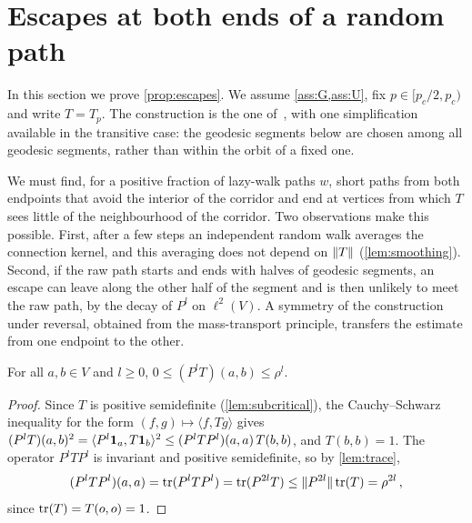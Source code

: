 \section{Escapes at both ends of a random path}\label{sec:escapes}

In this section we prove \cref{prop:escapes}. We assume \cref{ass:G,ass:U}, fix $p\in[p_c/2,p_c)$ and
write $T=T_p$. The construction is the one of~\cite{Ope26}, with one simplification available in the
transitive case: the geodesic segments below are chosen among all geodesic segments, rather than within
the orbit of a fixed one.

We must find, for a positive fraction of lazy-walk paths $w$, short paths from both endpoints that avoid
the interior of the corridor and end at vertices from which $T$ sees little of the neighbourhood of the
corridor. Two observations make this possible. First, after a few steps an independent random walk
averages the connection kernel, and this averaging does not depend on $\lVert T\rVert$
(\cref{lem:smoothing}). Second, if the raw path starts and ends with halves of geodesic segments, an
escape can leave along the other half of the segment and is then unlikely to meet the raw path, by the
decay of $P^l$ on $\ell^2(V)$. A symmetry of the construction under reversal, obtained from the
mass-transport principle, transfers the estimate from one endpoint to the other.

\begin{lemma}[Smoothing]\label{lem:smoothing}
For all $a,b\in V$ and $l\ge0$, $0\le(P^lT)(a,b)\le\rho^l$.
\end{lemma}

\begin{proof}
Since $T$ is positive semidefinite (\cref{lem:subcritical}), the Cauchy--Schwarz inequality for the form
$(f,g)\mapsto\langle f,Tg\rangle$ gives
$(P^lT)(a,b)^2=\langle P^l\mathbf{1}_a,T\mathbf{1}_b\rangle^2\le(P^lTP^l)(a,a)\,T(b,b)$, and $T(b,b)=1$. The
operator $P^lTP^l$ is invariant and positive semidefinite, so by \cref{lem:trace},
\begin{equation*}
  (P^lTP^l)(a,a)=\operatorname{tr}(P^lTP^l)=\operatorname{tr}(P^{2l}T)\le\lVert P^{2l}\rVert\operatorname{tr}(T)=\rho^{2l}\,,
\end{equation*}
since $\operatorname{tr}(T)=T(o,o)=1$.
\end{proof}

